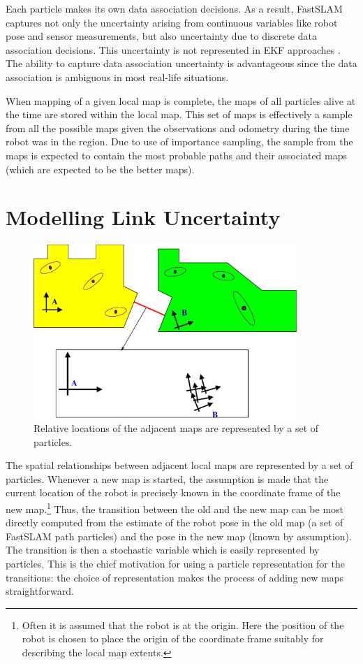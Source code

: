 Each particle makes its own data association decisions. As a result,
FastSLAM captures not only the uncertainty arising from continuous
variables like robot pose and sensor measurements, but also
uncertainty due to discrete data association decisions. This
uncertainty is not represented in EKF approaches \cite{ekf_slam}.  The
ability to capture data association uncertainty is advantageous since
the data association is ambiguous in most real-life situations.

When mapping of a given local map is complete, the maps of all
particles alive at the time are stored within the local map. This set
of maps is effectively a sample from all the possible maps given the
observations and odometry during the time robot was in the region.
Due to use of importance sampling, the sample from the maps is
expected to contain the most probable paths and their associated maps
(which are expected to be the better maps).

\section{Modelling Link Uncertainty}
\label{sec:link}

\begin{figure}
\begin{center}
\includegraphics[width=10cm]{Pics/fig_transition_model}
\end{center}
\caption[Modeling transition distribution]
{Relative locations of the adjacent maps are represented by a
  set of particles.}
\end{figure}

The spatial relationships between adjacent local maps are 
represented by a set of particles.  Whenever a new map is started, the assumption is made
that the current location of the robot is precisely known in the  coordinate frame of the new
map.\footnote{Often it is assumed that the robot is
at the origin.  Here the position of the robot is chosen to place the
origin of the coordinate frame suitably for describing the local map
extents.} Thus, the transition between the old and the new map can be
most directly computed from the estimate of the robot pose in the old
map (a set of FastSLAM path particles) and the pose in the new map
(known by assumption). The transition is then a stochastic variable
which is easily represented by particles. This is the chief
motivation for using a particle representation for the
transitions: the choice of representation makes the process of adding
new maps straightforward.

